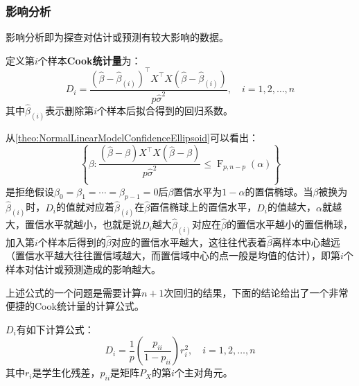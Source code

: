 \subsubsection{影响分析}
影响分析即为探查对估计或预测有较大影响的数据。
\begin{definition}
	定义第$i$个样本\textbf{Cook统计量}为：
	\begin{equation*}
		D_i=\frac{(\hat{\beta}-\hat{\beta}_{(i)})^{\top}X^{\top}X(\hat{\beta}-\hat{\beta}_{(i)})}{p\hat{\sigma}^2},\quad i=1,2,\dots,n
	\end{equation*}
	其中$\hat{\beta}_{(i)}$表示删除第$i$个样本后拟合得到的回归系数。
\end{definition}
\begin{note}
	从\cref{theo:NormalLinearModelConfidenceEllipsoid}可以看出：
	\begin{equation*}
		\left\{\beta:\frac{(\hat{\beta}-\beta)X^{\top}X(\hat{\beta}-\beta)}{p\hat{\sigma}^2}\leqslant\operatorname{F}_{p,n-p}(\alpha)\right\}
	\end{equation*}
	是拒绝假设$\beta_0=\beta_1=\cdots=\beta_{p-1}=0$后$\beta$置信水平为$1-\alpha$的置信椭球。当$\beta$被换为$\hat{\beta}_{(i)}$时，$D_i$的值就对应着$\hat{\beta}_{(i)}$在$\hat{\beta}$置信椭球上的置信水平，$D_i$的值越大，$\alpha$就越大，置信水平就越小，也就是说$D_i$越大$\hat{\beta}_{(i)}$对应在$\hat{\beta}$的置信水平越小的置信椭球，加入第$i$个样本后得到的$\hat{\beta}$对应的置信水平越大，这往往代表着$\hat{\beta}$离样本中心越远（置信水平越大往往置信域越大，而置信域中心的点一般是均值的估计），即第$i$个样本对估计或预测造成的影响越大。\par
	上述公式的一个问题是需要计算$n+1$次回归的结果，下面的结论给出了一个非常便捷的Cook统计量的计算公式。
\end{note}
\begin{theorem}\label{theo:CookStatistic}
	$D_i$有如下计算公式：
	\begin{equation*}
		D_i=\frac{1}{p}\left(\frac{p_{ii}}{1-p_{ii}}\right)r_i^2,\quad i=1,2,\dots,n
	\end{equation*}
	其中$r_i$是学生化残差，$p_{ii}$是矩阵$P_X$的第$i$个主对角元。
\end{theorem}
